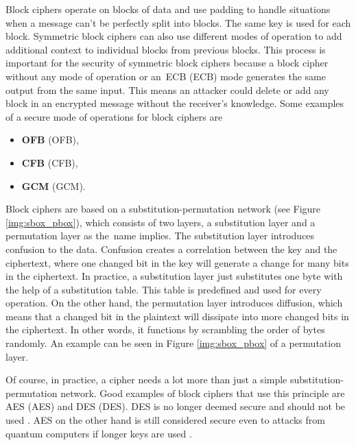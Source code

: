 Block ciphers operate on blocks of data and use padding to handle situations when a message can't be perfectly split into blocks. The same key is used for each block. Symmetric block ciphers can also use different modes of operation to add additional context to individual blocks from previous blocks. This process is important for the security of symmetric block ciphers because a block cipher without any mode of operation or an~ECB (\acl{ECB}) mode generates the same output from the same input. This means an attacker could delete or add any block in an encrypted message without the receiver's knowledge. Some examples of a secure mode of operations for block ciphers are \cite{Paar2010}
\begin{itemize}
  \item \textbf{OFB} (\acl{OFB}),
  \item \textbf{CFB} (\acl{CFB}),
  \item \textbf{GCM} (\acl{GCM}).
\end{itemize}

Block ciphers are based on a substitution-permutation network (see Figure \ref{img:sbox_pbox}), which consists of two layers, a substitution layer and a permutation layer as the~name implies. The substitution layer introduces confusion to the data. Confusion creates a correlation between the key and the ciphertext, where one changed bit in the key will generate a change for many bits in the ciphertext. In practice, a substitution layer just substitutes one byte with the help of a substitution table. This table is predefined and used for every operation. On the other hand, the permutation layer introduces diffusion, which means that a changed bit in the plaintext will dissipate into more changed bits in the ciphertext. In other words, it functions by scrambling the order of bytes randomly. An example can be seen in Figure \ref{img:sbox_pbox} of a permutation layer. \cite{Paar2010}\cite{Shannon1949}

Of course, in practice, a cipher needs a lot more than just a simple substitution-permutation network. Good examples of block ciphers that use this principle are AES (\acl{AES}) and DES (\acl{DES}). DES is no longer deemed secure and should not be used \cite{Barker2017}. AES on the other hand is still considered secure even to attacks from quantum computers if longer keys are used \cite{Chen2016}.


